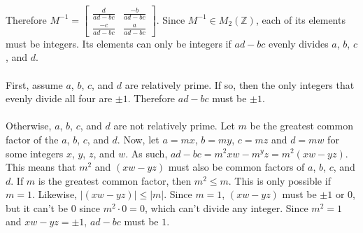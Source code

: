 \documentclass{article}
\begin{document}
\begin{enumerate}
Therefore $M^{-1} = \begin{bmatrix} \frac{d}{ad-bc} & \frac{-b}{ad-bc} \\
\frac{-c}{ad-bc} & \frac{a}{ad-bc}\end{bmatrix}$.  Since $M^{-1} \in M_2(\mathbb{Z})$,
each of its elements must be integers.  Its elements can only be
integers if $ad-bc$ evenly divides $a$, $b$, $c$, and $d$. \\
\\
First, assume $a$, $b$, $c$, and $d$ are relatively prime.  If so, then the
only integers that evenly divide all four are $\pm1$.  Therefore
${ad-bc}$ must be $\pm1$. \\
\\
Otherwise, $a$, $b$, $c$, and $d$ are not relatively prime.  Let $m$ be the
greatest common factor of the $a$, $b$, $c$, and $d$.  Now, let $a = mx$,
$b = my$, $c = mz$ and $d = mw$ for some integers $x$, $y$, $z$, and $w$.
As such, $ad - bc = m^2xw - m^yz = m^2(xw - yz)$.  This means that
$m^2$ and $(xw - yz)$ must also be common factors of $a$, $b$, $c$, and $d$.
If $m$ is the greatest common factor, then $m^2 \leq m $.  This is only
possible if $m = 1$.  Likewise, $\vert (xw - yz) \vert \leq \vert m \vert$.
Since $m = 1$, $(xw - yz)$ must be $\pm1$ or $0$, but it can't be $0$ since
$m^2 \cdot 0 = 0$, which can't divide any integer.  Since $m^2 = 1$ and
$xw - yz = \pm1$, $ad - bc$ must be $1$.


\end{enumerate}
\end{document}
